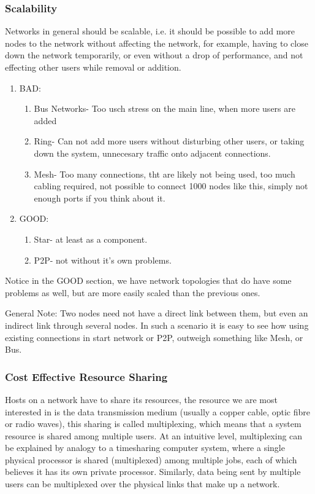 \documentclass[11pt, a4paper]{article}
\begin{document}
\subsubsection{Scalability}
Networks in general should be scalable, i.e. it should be possible to add more nodes to the network without affecting the network, for example, having to close down the network temporarily, or even without a drop of performance, and not effecting other users while removal or addition.
\begin{enumerate}
    \item BAD:
    \begin{enumerate}
        \item Bus Networks- Too usch stress on the main line, when more users are added
        \item Ring- Can not add more users without disturbing other users, or taking down the system, unnecesary traffic onto adjacent connections.
        \item Mesh- Too many connections, tht are likely not being used, too much cabling required, not possible to connect 1000 nodes like this, simply not enough ports if you think about it.
    \end{enumerate}
    \item GOOD:
    \begin{enumerate}
        \item Star- at least as a component.
        \item P2P- not without it's own problems.
    \end{enumerate}
\end{enumerate}
Notice in the GOOD section, we have network topologies that do have some problems as well, but are more easily scaled than the previous ones.

General Note: Two nodes need not have a direct link between them, but even an indirect link through several nodes. In such a scenario it is easy to see how using existing connections in start network or P2P, outweigh something like Mesh, or Bus. 

\subsubsection{Cost Effective Resource Sharing}
Hosts on a network have to share its resources, the resource we are most interested in is the data transmission medium (usually a copper cable, optic fibre or radio waves), this sharing is called multiplexing, which means that a system resource is shared among multiple users. At an intuitive level, multiplexing can be explained by analogy to a timesharing computer system, where a single physical processor is shared (multiplexed) among multiple jobs, each of which believes it has its own private processor. Similarly, data being sent by multiple users can be multiplexed over the physical links that make up a network.
\end{document}
